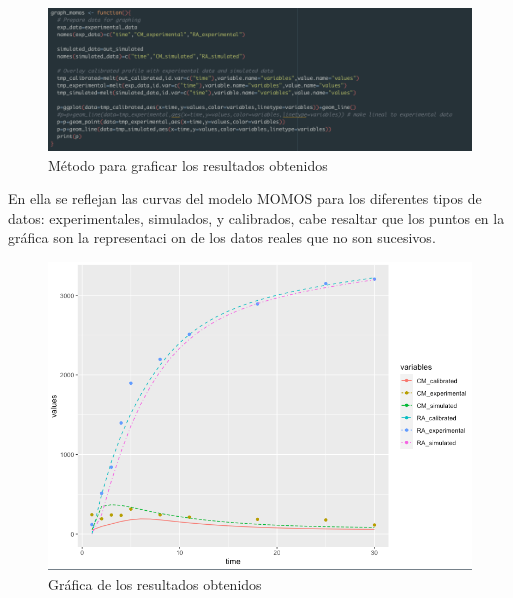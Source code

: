 \begin{figure}[H]
  \centering
    \begin{minipage}{1\textwidth}
      \centering
      \includegraphics[width=1\textwidth]{figure_4_19.png}
      \caption{M\'etodo para graficar los resultados obtenidos}
      \label{fig:Fig}
    \end{minipage}%
    \hspace{5mm}
\end{figure}

En ella se reflejan las curvas del modelo MOMOS para los diferentes tipos de datos: experimentales, simulados, y calibrados, cabe resaltar que los puntos en la gr\'afica son la representaci
on de los datos reales que no son sucesivos.\\

\begin{figure}[H]
  \centering
    \begin{minipage}{1\textwidth}
      \centering
      \includegraphics[width=1\textwidth]{figure_4_20.png}
      \caption{Gr\'afica de los resultados obtenidos}
      \label{fig:Fig}
    \end{minipage}%
    \hspace{5mm}
\end{figure}
